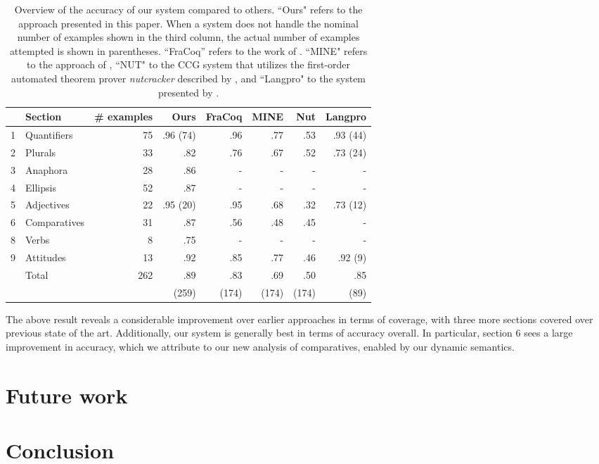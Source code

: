 \documentclass{article}
\begin{document}
\providecommand\forcecenter{\multicolumn{1}{c}}
\begin{table}
  \centering
\begin{tabular}{rlrrrrrr}
  & Section      & \# examples & Ours     & FraCoq & MINE & Nut  & Langpro  \\ \hline
1 & Quantifiers  & 75          & .96 (74) & .96    & .77  & .53  & .93 (44) \\
2 & Plurals      & 33          & .82      & .76    & .67  & .52  & .73 (24) \\
3 & Anaphora     & 28          & .86      &   -    & -    & -    &  -       \\
4 & Ellipsis     & 52          & .87      &   -    & -    & -    &  -       \\
5 & Adjectives   & 22          & .95 (20) & .95    & .68  & .32  & .73 (12) \\
6 & Comparatives & 31          & .87      & .56    & .48  & .45  &  -       \\
8 & Verbs        & 8           & .75      &   -    & -    & -    &  -       \\
9 & Attitudes    & 13          & .92      & .85    & .77  & .46  & .92 (9)  \\ \hline
  & Total        & 262         & .89      & .83    & .69  & .50  & .85  \\
  &              &             & (259)    & (174)  & (174)& (174)& (89)
  \end{tabular}
  \caption{Overview of the accuracy of our system compared to others.
    ``Ours" refers to the approach presented in this paper. When a
    system does not handle the nominal number of examples shown in the
    third column, the actual number of examples attempted is shown in
    parentheses.  ``FraCoq'' refers to the work of
    \citet{bernardy_type_2017}. ``MINE" refers to the approach of
    \citet{Mineshima:2015}, ``NUT" to the CCG system that utilizes the
    first-order automated theorem prover \textit{nutcracker} described
    by \citet{bos:2008}, and ``Langpro" to the system presented by
    \citet{Abzianidze:2015}.  }
\end{table}


The above result reveals a considerable improvement over earlier
approaches in terms of coverage, with three more sections covered over
previous state of the art. Additionally, our system is generally best
in terms of accuracy overall. In particular, section 6 sees a large
improvement in accuracy, which we attribute to our new analysis of
comparatives, enabled by our dynamic semantics.


\section{Future work}
\section{Conclusion}


\printbibliography
\end{document}
